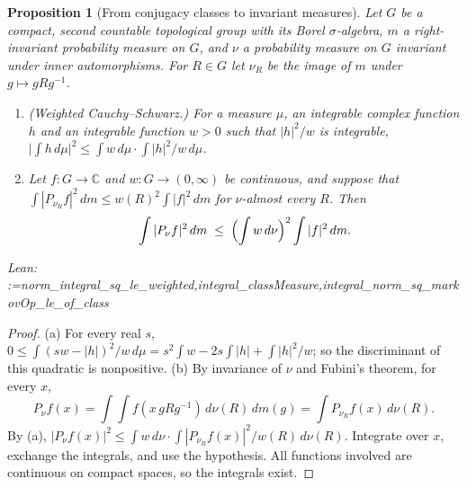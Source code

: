 \documentclass[11pt]{amsart}
\makeatletter
\newtheorem{proposition}[theorem]{Proposition}
\theoremstyle{definition}
\theoremstyle{remark}
\newcommand{\@leanlist}[1]{\def\@leansep{}\@for\@leanname:=#1\do{\@leansep
  \texttt{\expandafter\detokenize\expandafter{\@leanname}}\def\@leansep{, }}}
\newcommand{\lean}[1]{\par\smallskip\noindent
  {\footnotesize\normalfont\raggedright\textsf{Lean:} \@leanlist{#1}\par}}
\newcommand{\C}{\mathbb{C}}
\makeatother
\begin{document}
\begin{proposition}[From conjugacy classes to invariant measures]\label{prop:classes}
Let $G$ be a compact, second countable topological group with its Borel $\sigma$-algebra, $m$ a
right-invariant probability measure on $G$, and $\nu$ a probability measure on $G$ invariant
under inner automorphisms.  For $R\in G$ let $\nu_R$ be the image of $m$ under
$g\mapsto gRg^{-1}$.
\begin{enumerate}
\item[(a)] (Weighted Cauchy--Schwarz.)  For a measure $\mu$, an integrable complex function $h$
and an integrable function $w>0$ such that $|h|^2/w$ is integrable,
$\bigl|\int h\,d\mu\bigr|^2\le\int w\,d\mu\cdot\int|h|^2/w\,d\mu$.
\item[(b)] Let $f\colon G\to\C$ and $w\colon G\to(0,\infty)$ be continuous, and suppose that
$\int|P_{\nu_R}f|^2\,dm\le w(R)^2\int|f|^2\,dm$ for $\nu$-almost every $R$.  Then
\[
  \int|P_\nu f|^2\,dm\;\le\;\Bigl(\int w\,d\nu\Bigr)^2\int|f|^2\,dm .
\]
\end{enumerate}
\lean{norm_integral_sq_le_weighted,integral_classMeasure,integral_norm_sq_markovOp_le_of_class}
\end{proposition}

\begin{proof}
(a) For every real $s$, $0\le\int(sw-|h|)^2/w\,d\mu=s^2\int w-2s\int|h|+\int|h|^2/w$; so the
discriminant of this quadratic is nonpositive.  (b) By invariance of $\nu$ and Fubini's
theorem, for every $x$,
\[
  P_\nu f(x)=\int\!\!\int f(x\,gRg^{-1})\,d\nu(R)\,dm(g)=\int P_{\nu_R}f(x)\,d\nu(R).
\]
By (a), $|P_\nu f(x)|^2\le\int w\,d\nu\cdot\int|P_{\nu_R}f(x)|^2/w(R)\,d\nu(R)$.  Integrate over
$x$, exchange the integrals, and use the hypothesis.  All functions involved are continuous on
compact spaces, so the integrals exist.
\end{proof}
\end{document}
